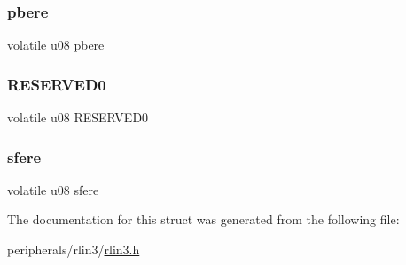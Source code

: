 \subsubsection{\texorpdfstring{pbere}{pbere}}
{\footnotesize\ttfamily volatile u08 pbere}

\mbox{\label{structrlin3__lede__lin_a59c0b30ccfb89f1b34e9682741859abd}} 
\subsubsection{\texorpdfstring{R\+E\+S\+E\+R\+V\+E\+D0}{RESERVED0}}
{\footnotesize\ttfamily volatile u08 R\+E\+S\+E\+R\+V\+E\+D0}

\mbox{\label{structrlin3__lede__lin_ad61759570404801676abb272aadee33f}} 
\subsubsection{\texorpdfstring{sfere}{sfere}}
{\footnotesize\ttfamily volatile u08 sfere}



The documentation for this struct was generated from the following file\+:\begin{DoxyCompactItemize}
\item 
peripherals/rlin3/\mbox{\hyperlink{rlin3_8h}{rlin3.\+h}}\end{DoxyCompactItemize}
